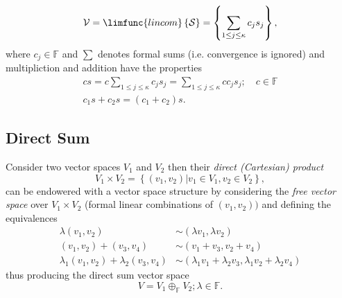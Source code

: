 \documentclass[aps,preprint]{revtex4}
\begin{document}
\begin{equation}
\mathcal{V}=\limfunc{lincom}\left\{ \mathcal{S}\right\} =\left\{
\sum\limits_{1\leq j\leq\kappa}c_{j}s_{j}\right\} ,
\end{equation}
where $c_{j}\in\mathbb{F}$ and $\sum$ denotes formal sums (i.e. convergence
is ignored) and multipliction and addition have the properties 
\begin{gather}
cs=c\sum\limits_{1\leq j\leq\kappa}c_{j}s_{j}=\sum\limits_{1\leq j\leq\kappa
}cc_{j}s_{j};\quad c\in\mathbb{F} \\
c_{1}s+c_{2}s=\left( c_{1}+c_{2}\right) s.
\end{gather}

\subsection{Direct Sum}

Consider two vector spaces $V_{1}$ and $V_{2}$ then their \emph{direct
(Cartesian) product} 
\begin{equation}
V_{1}\times V_{2}=\left\{ \left. \left( v_{1},v_{2}\right) \right\vert
v_{1}\in V_{1},v_{2}\in V_{2}\right\} ,
\end{equation}
can be endowered with a vector space structure by considering the \emph{free
vector space} over $V_{1}\times V_{2}$ (formal linear combinations of $%
\left( v_{1},v_{2}\right) )$ and defining the equivalences 
\begin{align}
\lambda\left( v_{1},v_{2}\right) & \sim\left( \lambda v_{1},\lambda
v_{2}\right) \\
\left( v_{1},v_{2}\right) +\left( v_{3},v_{4}\right) & \sim\left(
v_{1}+v_{3},v_{2}+v_{4}\right) \\
\lambda_{1}\left( v_{1},v_{2}\right) +\lambda_{2}\left( v_{3},v_{4}\right) &
\sim\left( \lambda_{1}v_{1}+\lambda_{2}v_{3},\lambda_{1}v_{2}+\lambda
_{2}v_{4}\right)
\end{align}
thus producing the direct sum vector space 
\begin{equation}
V=V_{1}\oplus_{\mathbb{F}}V_{2};\lambda\in\mathbb{F}.
\end{equation}
\end{document}
